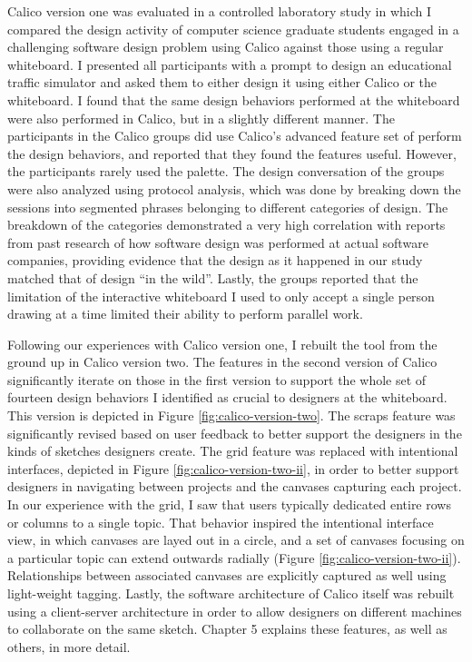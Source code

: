 Calico version one was evaluated in a controlled laboratory study in which I compared the design activity of computer science graduate students engaged in a challenging software design problem using Calico against those using a regular whiteboard. I presented all participants with a prompt to design an educational traffic simulator and asked them to either design it using either Calico or the whiteboard. I found that the same design behaviors performed at the whiteboard were also performed in Calico, but in a slightly different manner. The participants in the Calico groups did use Calico's advanced feature set of perform the design behaviors, and reported that they found the features useful. However, the participants rarely used the palette. The design conversation of the groups were also analyzed using protocol analysis, which was done by breaking down the sessions into segmented phrases belonging to different categories of design. The breakdown of the categories demonstrated a very high correlation with reports from past research of how software design was performed at actual software companies, providing evidence that the design as it happened in our study matched that of design ``in the wild''. Lastly, the groups reported that the limitation of the interactive whiteboard I used to only accept a single person drawing at a time limited their ability to perform parallel work.

Following our experiences with Calico version one, I rebuilt the tool from the ground up in Calico version two. The features in the second version of Calico significantly iterate on those in the first version to support the whole set of fourteen design behaviors I identified as crucial to designers at the whiteboard. This version is depicted in Figure \ref{fig:calico-version-two}. The scraps feature was significantly revised based on user feedback to better support the designers in the kinds of sketches designers create. The grid feature was replaced with intentional interfaces, depicted in Figure \ref{fig:calico-version-two-ii}, in order to better support designers in navigating between projects and the canvases capturing each project. In our experience with the grid, I saw that users typically dedicated entire rows or columns to a single topic. That behavior inspired the intentional interface view, in which canvases are layed out in a circle, and a set of canvases focusing on a particular topic can extend outwards radially (Figure \ref{fig:calico-version-two-ii}). Relationships between associated canvases are explicitly captured as well using light-weight tagging. Lastly, the software architecture of Calico itself was rebuilt using a client-server architecture in order to allow designers on different machines to collaborate on the same sketch. Chapter 5 explains these features, as well as others, in more detail.

